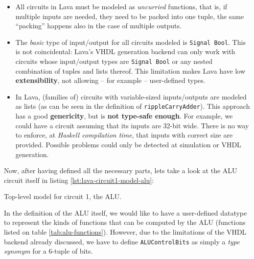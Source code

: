 \documentclass[a4paper]{article}
\begin{document}
                \begin{itemize}
                    \item All circuits in Lava must be modeled as \emph{uncurried} functions, that
                        is, if multiple inputs are needed, they need to be packed into one tuple, the
                        same ``packing'' happens also in the case of multiple outputs.

                    \item The \emph{basic} type of input/output for all circuits modeled is
                        \texttt{Signal Bool}. This is not coincidental: Lava's VHDL generation
                        backend can only work with circuits whose input/output types are
                        \texttt{Signal Bool} or any nested combination of tuples and lists thereof.
                        This limitation makes Lava have low \textbf{extensibility}, not allowing
                        -- for example -- user-defined types.

                    \item In Lava, (families of) circuits with variable-sized inputs/outputs are
                        modeled as lists (as can be seen in the definition of
                        \texttt{rippleCarryAdder}). This approach has a good \textbf{genericity},
                        but is \textbf{not type-safe enough}. For example, we could have a circuit
                        assuming that its inputs are 32-bit wide.  There is no way to enforce, at
                        \emph{Haskell compilation time}, that inputs with correct size are
                        provided.  Possible problems could only be detected at simulation or VHDL
                        generation.
                \end{itemize}

                Now, after having defined all the necessary parts, lets take a look at the
                ALU circuit itself in listing \ref{lst:lava-circuit1-model-alu}:

                \begin{listing}[h!]
                    \caption{Top-level model for circuit 1, the ALU.
                        \label{lst:lava-circuit1-model-alu}}
                \end{listing}

                In the definition of the ALU itself, we would like to have a user-defined datatype
                to represent the kinds of functions that can be computed by the ALU (functions
                listed on table \ref{tab:alu-functions}). However, due to the limitations of the
                VHDL backend already discussed, we have to define \texttt{ALUControlBits} as simply
                a \emph{type synonym} for a 6-tuple of bits.
\end{document}
